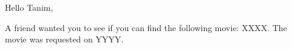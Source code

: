 \documentclass{article}
\begin{document}
Hello Tanim,

A friend wanted you to see if you can find the following movie:
XXXX. The movie was requested on YYYY.
\end{document}
